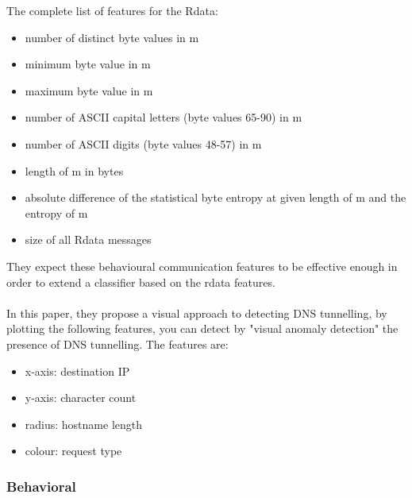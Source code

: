 The complete list of features for the Rdata:
\begin{itemize}
\item number of distinct byte values in m
\item minimum byte value in m
\item maximum byte value in m
\item number of ASCII capital letters (byte values 65-90) in m
\item number of ASCII digits (byte values 48-57) in m
\item length of m in bytes
\item absolute difference of the statistical byte entropy at given length of m and the entropy of m
\item size of all Rdata messages
\end{itemize}
They expect these behavioural communication features to be effective enough in order to extend a classifier based on the rdata features.
\\\\
In this paper\cite{tunn}, they propose a visual approach to detecting DNS tunnelling, by plotting the following features, you can detect by "visual anomaly detection" the presence of DNS tunnelling. The features are:
\begin{itemize}
\item x-axis: destination IP
\item y-axis: character count
\item radius: hostname length
\item colour: request type
\end{itemize}



\subsubsection{Behavioral}




